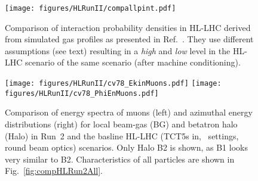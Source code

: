 \begin{figure}
\begin{center}
  \texttt{[image: figures/HLRunII/compallpint.pdf]}
\end{center}
\vspace{-0.6cm}
 \caption{Comparison of interaction probability densities in HL-LHC derived from simulated gas profiles as presented in Ref.~\cite{ipac2015_rkh}. They use different assumptions (see text) resulting in a \textit{high} and \textit{low} level in the HL-LHC scenario of the same scenario (after machine conditioning).
  \label{fig:gasprf}}
\end{figure}


\begin{figure}
\begin{center}
  \texttt{[image: figures/HLRunII/cv78\_EkinMuons.pdf]}
  \texttt{[image: figures/HLRunII/cv78\_PhiEnMuons.pdf]}
\end{center}
\vspace{-0.6cm}
 \caption{Comparison of energy spectra of muons (left) and azimuthal energy distributions (right) for local beam-gas (BG) and betatron halo (Halo) in Run~2 and the basline HL-LHC (TCT5s in, \twosigmaret~settings, round beam optics) scenarios. Only Halo B2 is shown, as B1 looks very similar to B2. Characteristics of all particles are shown in Fig.~\ref{fig:compHLRun2All}.
  \label{fig:HLR2Muons}}
\end{figure}
